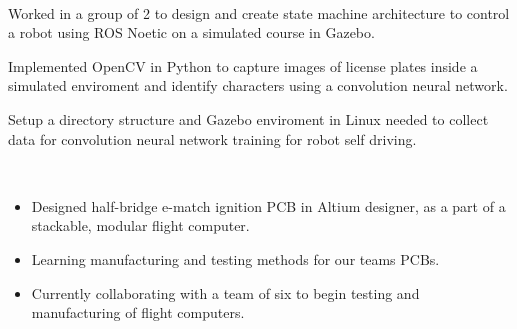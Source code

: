 \documentclass[a4paper]{MagicalCV}
\begin{document}
\begin{minipage}[t]{0.72\textwidth}
 \\
\begin{tightemize}
        \item Worked in a group of 2 to design and create state machine architecture to control a robot using ROS Noetic on a simulated course in Gazebo.
        \item Implemented OpenCV in Python to capture images of license plates inside a simulated enviroment and identify characters using a convolution neural network.
        \item Setup a directory structure and Gazebo enviroment in Linux needed to collect data for convolution neural network training for robot self driving.
\end{tightemize}
\sectionsep

 \\
\begin{itemize}
    \item Designed half-bridge e-match ignition PCB in Altium designer, as a part of a stackable, modular flight computer.
    \item Learning manufacturing and testing methods for our teams PCBs.   
    \item Currently collaborating with a team of six to begin testing and manufacturing of flight computers.
\end{itemize} 
\sectionsep



\end{minipage} 
\end{document}

